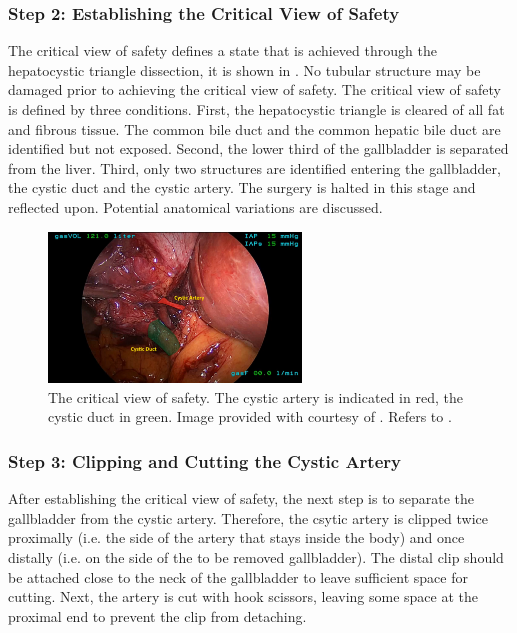 \subsubsection{Step 2: Establishing the Critical View of Safety} 
\label{in:sec:critical_view_of_safety}
The critical view of safety defines a state that is achieved through the hepatocystic triangle dissection, it is shown in . No tubular structure may be damaged prior to achieving the critical view of safety. The critical view of safety is defined by three conditions. First, the hepatocystic triangle is cleared of all fat and fibrous tissue. The common bile duct and the common hepatic bile duct are identified but not exposed. Second, the lower third of the gallbladder is separated from the liver. Third, only two structures are identified entering the gallbladder, the cystic duct and the cystic artery. The surgery is halted in this stage and reflected upon. Potential anatomical variations are discussed.

\begin{figure}[tb]
    \centering
    \includegraphics[width=0.6\textwidth]{introduction/img/critical_view_of_safety.png}
    \caption{The critical view of safety. The cystic artery is indicated in red, the cystic duct in green. Image provided with courtesy of \cite{ALES5766}. Refers to .}
    \label{fig:enter-label}
\end{figure}

\subsubsection{Step 3: Clipping and Cutting the Cystic Artery} After establishing the critical view of safety, the next step is to separate the gallbladder from the cystic artery. Therefore, the csytic artery is clipped twice proximally (i.e. the side of the artery that stays inside the body) and once distally (i.e. on the side of the to be removed gallbladder). The distal clip should be attached close to the neck of the gallbladder to leave sufficient space for cutting. Next, the artery is cut with hook scissors, leaving some space at the proximal end to prevent the clip from detaching.

